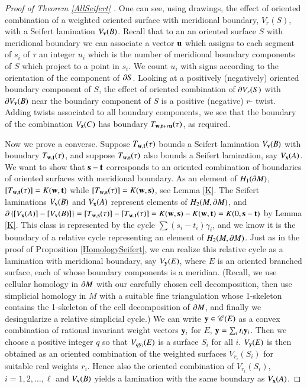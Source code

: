 \documentclass[12pt]{article}
\theoremstyle{remark}
\begin{document}
  \begin{proof}[Proof of Theorem \ref{AllSeifert} ]  One can see, using drawings, the effect of oriented combination of a weighted oriented surface with meridional boundary, $V_r(S)$, with a Seifert lamination $V_{\bf v}(B)$.  Recall that to an an oriented surface $S$ with meridional boundary we can associate a vector ${\bf u}$ which assigns to each segment of $s_i$ of $\tau$ an integer $u_i$ which is the number of meridional boundary components of $S$ which project to a point in $s_i$.   We count $u_i$ with signs according to the orientation of the component of $\partial S$.   Looking at a positively (negatively) oriented boundary component of $S$, the effect of oriented combination of $\partial V_r(S)$ with $\partial V_{\bf v}(B)$ near the boundary component of $S$ is a positive (negative) $r$- twist.   Adding twists associated to all boundary components, we see that the boundary of the combination $V_{\bf z}(C)$ has boundary $T_{{\bf w},{\bf t}+r{\bf u}}(\tau)$, as required.
 
 Now we prove a converse.  Suppose $T_{{\bf w},{\bf t}}(\tau)$ bounds a Seifert lamination $V_{\bf v}(B)$ with boundary $T_{{\bf w},{\bf t}}(\tau)$, and suppose $T_{{\bf w},{\bf s}}(\tau)$ also bounds a Seifert lamination, say $V_{\bf x}(A)$.   We want to show that ${\bf s}-{\bf t}$ corresponds to an oriented combination of boundaries of oriented surfaces with meridional boundary.   As an element of $H_1(\partial M)$, $ [T_{{\bf w},{\bf t}}(\tau)]=K({\bf w},{\bf t})$ while $[T_{{\bf w},{\bf s}}(\tau)]=K({\bf w},{\bf s})$, see Lemma \ref{K}.  The Seifert laminations $V_{\bf v}(B)$ and $V_{{\bf x}}(A)$ represent elements of $H_2(M,\partial M)$, and $\partial\left\{[ V_{\bf x}(A)]-[V_{{\bf v}}(B)]\right\}=[T_{{\bf w},{\bf s}}(\tau)]- [T_{{\bf w},{\bf t}}(\tau)]=K({\bf w},{\bf s})-K({\bf w},{\bf t})=K(0,{\bf s}-{\bf t})$ by Lemma \ref{K}.   This class is represented by the cycle $\sum (s_i-t_i)\gamma_i$, and we know it is the boundary of a relative cycle representing an element of $H_2(M,\partial M)$.  Just as in the proof of Proposition \ref{HomologySeifert}, we can realize this relative cycle as a lamination with meridional boundary, say $V_{\bf y}(E)$, where $E$ is an oriented branched surface, each of whose boundary components is a meridian.    (Recall, we use cellular homology in $\partial M$ with our carefully chosen cell decomposition, then use simplicial homology in $M$ with a suitable fine triangulation whose 1-skeleton contains the 1-skeleton of the cell decomposition of $\partial M$, and finally we desingularize a relative simplicial cycle.) We can write ${\bf y}\in \mathscr{C}(E)$ as a convex combination of rational invariant weight vectors ${\bf y}_i$ for $E$, ${\bf y}=\sum_i t_i{\bf y}_i$.  Then we choose a positive integer $q$ so that $V_{q{\bf y}_i}(E)$ is a surface $S_i$ for all $i$.  $V_{\bf y}(E)$ is then obtained as an oriented combination of the weighted surfaces $V_{r_i}(S_i)$ for suitable real weights $r_i$.   Hence also the oriented combination of $V_{r_i}(S_i)$, $i=1,2,\ldots, \ell$ and $V_{\bf v}(B)$ yields a lamination with the same boundary as $V_{\bf x}(A)$.
 \end{proof}

  


\end{document}
